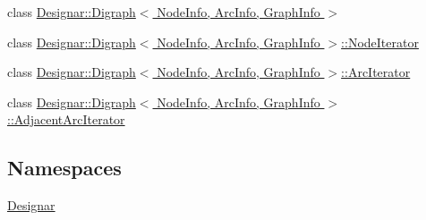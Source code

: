 \begin{DoxyCompactItemize}
\item 
class \hyperlink{class_designar_1_1_digraph}{Designar\+::\+Digraph$<$ Node\+Info, Arc\+Info, Graph\+Info $>$}
\item 
class \hyperlink{class_designar_1_1_digraph_1_1_node_iterator}{Designar\+::\+Digraph$<$ Node\+Info, Arc\+Info, Graph\+Info $>$\+::\+Node\+Iterator}
\item 
class \hyperlink{class_designar_1_1_digraph_1_1_arc_iterator}{Designar\+::\+Digraph$<$ Node\+Info, Arc\+Info, Graph\+Info $>$\+::\+Arc\+Iterator}
\item 
class \hyperlink{class_designar_1_1_digraph_1_1_adjacent_arc_iterator}{Designar\+::\+Digraph$<$ Node\+Info, Arc\+Info, Graph\+Info $>$\+::\+Adjacent\+Arc\+Iterator}
\end{DoxyCompactItemize}
\subsection*{Namespaces}
\begin{DoxyCompactItemize}
\item 
 \hyperlink{namespace_designar}{Designar}
\end{DoxyCompactItemize}

